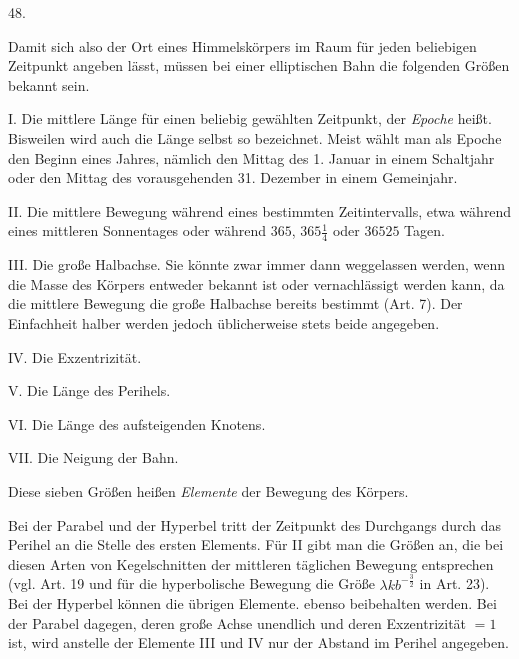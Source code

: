 \par{}
\begin{center}
\hypertarget{native-066-article048}{}48.
\end{center}
Damit sich also der Ort eines Himmelskörpers im Raum für jeden beliebigen Zeitpunkt angeben lässt, müssen bei einer elliptischen Bahn die folgenden Größen bekannt sein.

I. Die mittlere Länge für einen beliebig gewählten Zeitpunkt, der \emph{Epoche} heißt. Bisweilen wird auch die Länge selbst so bezeichnet. Meist wählt man als Epoche den Beginn eines Jahres, nämlich den Mittag des 1. Januar in einem Schaltjahr oder den Mittag des vorausgehenden 31. Dezember in einem Gemeinjahr.

II. Die mittlere Bewegung während eines bestimmten Zeitintervalls, etwa während eines mittleren Sonnentages oder während $365$, $365\tfrac{1}{4}$ oder $36525$ Tagen.

III. Die große Halbachse. Sie könnte zwar immer dann weggelassen werden, wenn die Masse des Körpers entweder bekannt ist oder vernachlässigt werden kann, da die mittlere Bewegung die große Halbachse bereits bestimmt (Art. 7). Der Einfachheit halber werden jedoch üblicherweise stets beide angegeben.

IV. Die Exzentrizität.

V. Die Länge des Perihels.

VI. Die Länge des aufsteigenden Knotens.

VII. Die Neigung der Bahn.

Diese sieben Größen heißen \emph{Elemente} der Bewegung des Körpers.

Bei der Parabel und der Hyperbel tritt der Zeitpunkt des Durchgangs durch das Perihel an die Stelle des ersten Elements. Für II gibt man die Größen an, die bei diesen Arten von Kegelschnitten der mittleren täglichen Bewegung entsprechen (vgl. Art. 19 und für die hyperbolische Bewegung die Größe $\lambda k b^{-\frac{3}{2}}$ in Art. 23). Bei der Hyperbel können die übrigen Elemente. ebenso beibehalten werden. Bei der Parabel dagegen, deren große Achse unendlich und deren Exzentrizität $=1$ ist, wird anstelle der Elemente III und IV nur der Abstand im Perihel angegeben.

